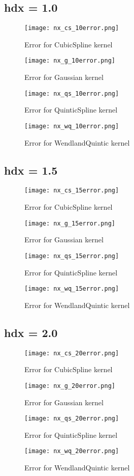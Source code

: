 \documentclass[12pt, a4paper]{report}
\begin{document}
\subsection{hdx = 1.0}
\begin{figure}[H]
	\texttt{[image: nx\_cs\_10error.png]}
	\caption{Error for CubicSpline kernel}
\end{figure}
\begin{figure}[H]
	\texttt{[image: nx\_g\_10error.png]}
	\caption{Error for Gaussian kernel}
\end{figure}
\begin{figure}[H]
	\texttt{[image: nx\_qs\_10error.png]}
	\caption{Error for QuinticSpline kernel}
\end{figure}
\begin{figure}[H]
	\texttt{[image: nx\_wq\_10error.png]}
	\caption{Error for WendlandQuintic kernel}
\end{figure}

\subsection{hdx = 1.5}
\begin{figure}[H]
	\texttt{[image: nx\_cs\_15error.png]}
	\caption{Error for CubicSpline kernel}
\end{figure}
\begin{figure}[H]
	\texttt{[image: nx\_g\_15error.png]}
	\caption{Error for Gaussian kernel}
\end{figure}
\begin{figure}[H]
	\texttt{[image: nx\_qs\_15error.png]}
	\caption{Error for QuinticSpline kernel}
\end{figure}
\begin{figure}[H]
	\texttt{[image: nx\_wq\_15error.png]}
	\caption{Error for WendlandQuintic kernel}
\end{figure}

\subsection{hdx = 2.0}
\begin{figure}[H]
	\texttt{[image: nx\_cs\_20error.png]}
	\caption{Error for CubicSpline kernel}
\end{figure}
\begin{figure}[H]
	\texttt{[image: nx\_g\_20error.png]}
	\caption{Error for Gaussian kernel}
\end{figure}
\begin{figure}[H]
	\texttt{[image: nx\_qs\_20error.png]}
	\caption{Error for QuinticSpline kernel}
\end{figure}
\begin{figure}[H]
	\texttt{[image: nx\_wq\_20error.png]}
	\caption{Error for WendlandQuintic kernel}
\end{figure}
\end{document}
